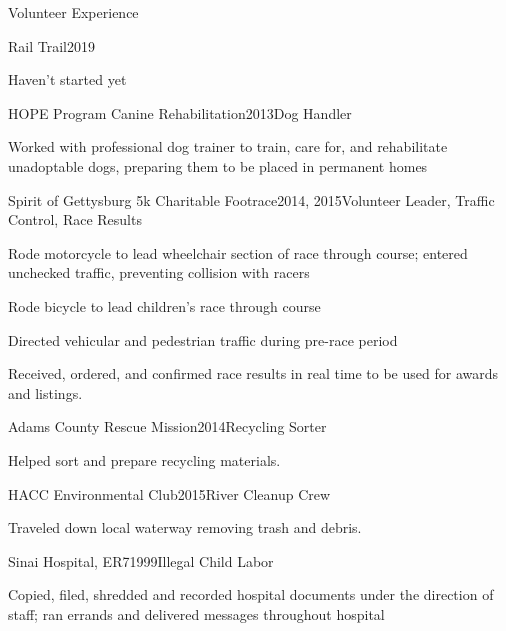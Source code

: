 \documentclass{resume} %
\begin{document}
\begin{rSection}{Volunteer Experience}


\begin{rWorkSubsection}{Rail Trail}{2019}{}{}
\item Haven't started yet
\end{rWorkSubsection}


\begin{rWorkSubsection}{HOPE Program Canine Rehabilitation}{2013}{Dog Handler}{}
\item Worked with professional dog trainer to train, care for, and rehabilitate unadoptable dogs, preparing them to be placed in permanent homes
\end{rWorkSubsection}


\begin{rWorkSubsection}{Spirit of Gettysburg 5k Charitable Footrace}{2014, 2015}{Volunteer Leader, Traffic Control, Race Results}{}
\item Rode motorcycle to lead wheelchair section of race through course; entered unchecked traffic, preventing collision with racers
\item Rode bicycle to lead children's race through course
\item Directed vehicular and pedestrian traffic during pre-race period
\item Received, ordered, and confirmed race results in real time to be used for awards and listings.
\end{rWorkSubsection}


\begin{rWorkSubsection}{Adams County Rescue Mission}{2014}{Recycling Sorter}{}
\item Helped sort and prepare recycling materials.
\end{rWorkSubsection}


\begin{rWorkSubsection}{HACC Environmental Club}{2015}{River Cleanup Crew}{}
\item Traveled down local waterway removing trash and debris.
\end{rWorkSubsection}


\begin{rWorkSubsection}{Sinai Hospital, ER7}{1999}{Illegal Child Labor}{}
\item Copied, filed, shredded and recorded hospital documents under the direction of staff; ran errands and delivered messages throughout hospital
\end{rWorkSubsection}

\end{rSection}
\end{document}
